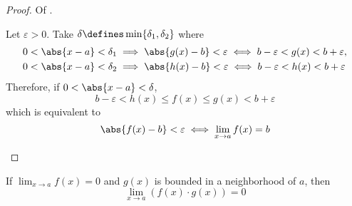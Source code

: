 \begin{proof}
	Of .
	\begin{flushleft}
		Let $\varepsilon>0$. Take $\delta\defines\min\{\delta_1,\delta_2\}$ where
		\begin{align*}
			 & 0 < \abs{x - a} < \delta_1 \implies \abs{g(x) - b} < \varepsilon \iff b - \varepsilon < g(x) < b + \varepsilon, \\
			 & 0 < \abs{x - a} < \delta_2 \implies \abs{h(x) - b} < \varepsilon \iff b - \varepsilon < h(x) < b + \varepsilon
		\end{align*}
		Therefore, if $0 < \abs{x - a} < \delta$,
		\begin{equation*}
			b - \varepsilon < h(x) \leq f(x) \leq g(x) < b + \varepsilon
		\end{equation*}
		which is equivalent to
		\begin{equation*}
			\abs{f(x) - b} < \varepsilon \iff \lim_{x \to a}f(x) = b
		\end{equation*}
	\end{flushleft}
\end{proof}

\begin{thm}\label{thm-product-of-bounded-zero-limit}
	If $\displaystyle\lim_{x \to a}f(x) = 0$ and $g(x)$ is bounded in a neighborhood
	of $a$, then
	\begin{equation*}
		\lim_{x \to a} \left(f(x)\cdot g(x)\right) = 0
	\end{equation*}
\end{thm}

